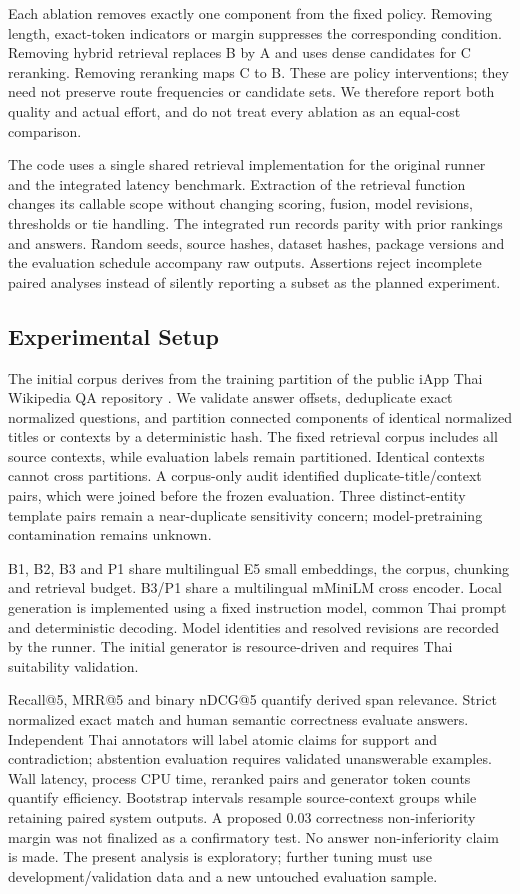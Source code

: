 Each ablation removes exactly one component from the fixed policy.
Removing length, exact-token indicators or margin suppresses the
corresponding condition. Removing hybrid retrieval replaces B by A and
uses dense candidates for C reranking. Removing reranking maps C to B.
These are policy interventions; they need not preserve route frequencies
or candidate sets. We therefore report both quality and actual effort,
and do not treat every ablation as an equal-cost comparison.

The code uses a single shared retrieval implementation for the original
runner and the integrated latency benchmark. Extraction of the retrieval
function changes its callable scope without changing scoring, fusion,
model revisions, thresholds or tie handling. The integrated run records
parity with prior rankings and answers. Random seeds, source hashes,
dataset hashes, package versions and the evaluation schedule accompany
raw outputs. Assertions reject incomplete paired analyses instead of
silently reporting a subset as the planned experiment.

\hypertarget{experimental-setup}{%
\subsection{Experimental Setup}\label{experimental-setup}}

The initial corpus derives from the training partition of the public
iApp Thai Wikipedia QA repository \citep{ref17}. We validate answer
offsets, deduplicate exact normalized questions, and partition connected
components of identical normalized titles or contexts by a deterministic
hash. The fixed retrieval corpus includes all source contexts, while
evaluation labels remain partitioned. Identical contexts cannot cross
partitions. A corpus-only audit identified duplicate-title/context
pairs, which were joined before the frozen evaluation. Three
distinct-entity template pairs remain a near-duplicate sensitivity
concern; model-pretraining contamination remains unknown.

B1, B2, B3 and P1 share multilingual E5 small embeddings, the corpus,
chunking and retrieval budget. B3/P1 share a multilingual mMiniLM cross
encoder. Local generation is implemented using a fixed instruction
model, common Thai prompt and deterministic decoding. Model identities
and resolved revisions are recorded by the runner. The initial generator
is resource-driven and requires Thai suitability validation.

Recall@5, MRR@5 and binary nDCG@5 quantify derived span relevance.
Strict normalized exact match and human semantic correctness evaluate
answers. Independent Thai annotators will label atomic claims for
support and contradiction; abstention evaluation requires validated
unanswerable examples. Wall latency, process CPU time, reranked pairs
and generator token counts quantify efficiency. Bootstrap intervals
resample source-context groups while retaining paired system outputs. A
proposed 0.03 correctness non-inferiority margin was not finalized as a
confirmatory test. No answer non-inferiority claim is made. The present
analysis is exploratory; further tuning must use development/validation
data and a new untouched evaluation sample.

